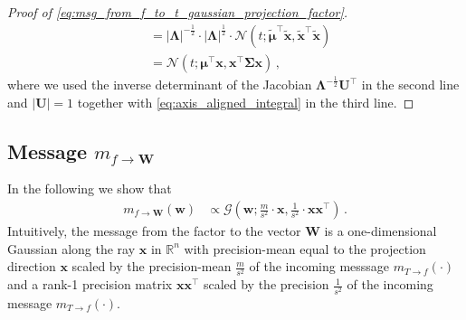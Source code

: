 \documentclass[a4paper]{article}
\newcommand{\Real}{{\mathbb R}}
\newcommand{\Normal}[3]{{\mathcal N} \left({#1};{#2},{#3}\right)}
\newcommand{\Gauss}[3]{{\mathcal G} \left({#1};{#2},{#3}\right)}
\newcommand{\bs}[1]{{\boldsymbol{#1}}}
\newcommand{\transpose}[1]{{#1}^\top}
\theoremstyle{definition}
\begin{document}
\begin{proof}[Proof of \eqref{eq:msg_from_f_to_t_gaussian_projection_factor}]
\begin{align*}
        & = \left| \bs{\Lambda} \right|^{-\frac{1}{2}} \cdot \left| \bs{\Lambda} \right|^{\frac{1}{2}} \cdot \Normal{t}{\transpose{\widetilde{\bs{\mu}}}\widetilde{\bs{x}}}{\transpose{\widetilde{\bs{x}}}\widetilde{\bs{x}}} \\
        & = \Normal{t}{\transpose{\bs{\mu}}\bs{x}}{\transpose{\bs{x}}\bs{\Sigma}\bs{x}} \,,
    \end{align*}
    where we used the inverse determinant of the Jacobian $\bs{\Lambda}^{-\frac{1}{2}} \transpose{\bs{U}}$ in the second line and $\left| \bs{U} \right| = 1$ together with \eqref{eq:axis_aligned_integral} in the third line.
\end{proof}

\subsection*{Message $m_{f\rightarrow \bs{W}}$}
In the following we show that
\begin{align}
    m_{f\rightarrow \bs{W}} (\bs{w})
     & \propto \Gauss{\bs{w}}{\frac{m}{s^2} \cdot \bs{x}}{\frac{1}{s^2} \cdot \bs{x}\transpose{\bs{x}}} \,. \label{eq:msg_from_f_to_w_gaussian_projection_factor}
\end{align}
Intuitively, the message from the factor to the vector $\bs{W}$ is a one-dimensional Gaussian along the ray $\bs{x}$ in $\Real^n$ with precision-mean equal to the projection direction $\bs{x}$ scaled by the precision-mean $\frac{m}{s^2}$ of the incoming messsage $m_{T \to f}(\cdot)$ and a rank-1 precision matrix $\bs{x}\transpose{\bs{x}}$ scaled by the precision $\frac{1}{s^2}$ of the incoming message $m_{T \to f}(\cdot)$.
\end{document}
